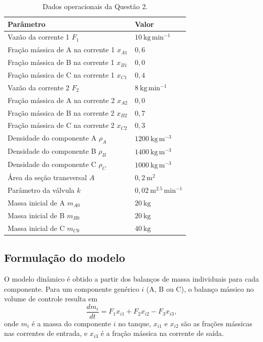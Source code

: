 \documentclass{article}
\begin{document}
\begin{table}[h!]
  \centering
  \begin{tabular}{ll}
    \hline
    \textbf{Parâmetro} & \textbf{Valor} \\
    \hline
    Vazão da corrente 1 $F_1$ & $10\ \mathrm{kg\,min^{-1}}$ \\
    Fração mássica de A na corrente 1 $x_{A1}$ & $0{,}6$ \\
    Fração mássica de B na corrente 1 $x_{B1}$ & $0{,}0$ \\
    Fração mássica de C na corrente 1 $x_{C1}$ & $0{,}4$ \\
    Vazão da corrente 2 $F_2$ & $8\ \mathrm{kg\,min^{-1}}$ \\
    Fração mássica de A na corrente 2 $x_{A2}$ & $0{,}0$ \\
    Fração mássica de B na corrente 2 $x_{B2}$ & $0{,}7$ \\
    Fração mássica de C na corrente 2 $x_{C2}$ & $0{,}3$ \\
    Densidade do componente A $\rho_A$ & $1200\ \mathrm{kg\,m^{-3}}$ \\
    Densidade do componente B $\rho_B$ & $1400\ \mathrm{kg\,m^{-3}}$ \\
    Densidade do componente C $\rho_C$ & $1000\ \mathrm{kg\,m^{-3}}$ \\
    Área da seção transversal $A$ & $0{,}2\ \mathrm{m^2}$ \\
    Parâmetro da válvula $k$ & $0{,}02\ \mathrm{m^{2.5}\,min^{-1}}$ \\
    Massa inicial de A $m_{A0}$ & $20\ \mathrm{kg}$ \\
    Massa inicial de B $m_{B0}$ & $20\ \mathrm{kg}$ \\
    Massa inicial de C $m_{C0}$ & $40\ \mathrm{kg}$ \\
    \hline
  \end{tabular}
  \caption{Dados operacionais da Questão 2.}
  \label{tab:dados-q2}
\end{table}

\subsection*{Formulação do modelo}

O modelo dinâmico é obtido a partir dos balanços de massa individuais para cada componente. Para um componente genérico $i$ (A, B ou C), o balanço mássico no volume de controle resulta em
\begin{equation*}
  \frac{dm_i}{dt} = F_1 x_{i1} + F_2 x_{i2} - F_3 x_{i3},
\end{equation*}
onde $m_i$ é a massa do componente $i$ no tanque, $x_{i1}$ e $x_{i2}$ são as frações mássicas nas correntes de entrada, e $x_{i3}$ é a fração mássica na corrente de saída.
\end{document}
